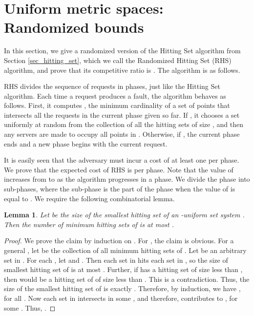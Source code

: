 \documentclass[11pt]{article}
\theoremstyle{plain}\newtheorem{theorem}{Theorem}
\newtheorem{lemma}[theorem]{Lemma}
\theoremstyle{definition}
\theoremstyle{remark}
\begin{document}
\section{Uniform metric spaces: Randomized bounds}\label{sec_uniform_random}

In this section, we give a randomized version of the Hitting Set algorithm from Section \ref{sec_hitting_set}, which we call the Randomized Hitting Set (RHS) algorithm, and prove that its competitive ratio is . The algorithm is as follows.

RHS divides the sequence of requests in phases, just like the Hitting Set algorithm. Each time a request produces a fault, the algorithm behaves as follows. First, it computes , the minimum cardinality of a set of points that intersects all the requests in the current phase given so far. If , it chooses a set  uniformly at random from the collection of all the hitting sets of size , and then any  servers are made to occupy all points in . Otherwise, if , the current phase ends and a new phase begins with the current request.

It is easily seen that the adversary must incur a cost of at least one per phase. We prove that the expected cost of RHS is  per phase. Note that the value of  increases from  to  as the algorithm progresses in a phase. We divide the phase into  sub-phases, where the  sub-phase is the part of the phase when the value of  is equal to . We require the following combinatorial lemma.


\begin{lemma}\label{lem_hittingset}
Let  be the size of the smallest hitting set of an -uniform set system . Then the number of minimum hitting sets of  is at most .
\end{lemma}

\begin{proof}
We prove the claim by induction on . For , the claim is obvious. For a general , let  be the collection of all minimum hitting sets of . Let  be an arbitrary set in . For each , let  and . 
Then each set in  hits each set in , so the size of smallest hitting set of  is at most . Further, if  has a hitting set  of size less than , then  would be a hitting set of  of size less than . This is a contradiction. Thus, the size of the smallest hitting set of  is exactly . Therefore, by induction, we have , for all . Now each set in  intersects  in some , and therefore, contributes to , for some . Thus, .
\end{proof}
\end{document}
